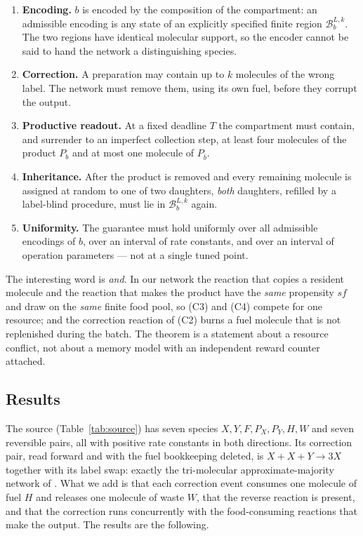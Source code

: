 \documentclass[11pt,a4paper]{article}
\theoremstyle{plain}
\theoremstyle{definition}
\theoremstyle{remark}
\newcommand{\B}{\mathcal B}
\begin{document}
\begin{enumerate}[label=(C\arabic*),leftmargin=2.6em]
\item \textbf{Encoding.} $b$ is encoded by the composition of the compartment: an
  admissible encoding is any state of an explicitly specified finite region
  $\B_b^{L,k}$. The two regions have identical molecular support, so the encoder cannot
  be said to hand the network a distinguishing species.
\item \textbf{Correction.} A preparation may contain up to $k$ molecules of the wrong
  label. The network must remove them, using its own fuel, before they corrupt the
  output.
\item \textbf{Productive readout.} At a fixed deadline $T$ the compartment must contain,
  and surrender to an imperfect collection step, at least four molecules of the product
  $P_b$ and at most one molecule of $P_{\bar b}$.
\item \textbf{Inheritance.} After the product is removed and every remaining molecule is
  assigned at random to one of two daughters, \emph{both} daughters, refilled by a
  label-blind procedure, must lie in $\B_b^{L,k}$ again.
\item \textbf{Uniformity.} The guarantee must hold uniformly over all admissible
  encodings of $b$, over an interval of rate constants, and over an interval of
  operation parameters --- not at a single tuned point.
\end{enumerate}

The interesting word is \emph{and}. In our network the reaction that copies a resident
molecule and the reaction that makes the product have the \emph{same} propensity $sf$ and
draw on the \emph{same} finite food pool, so (C3) and (C4) compete for one resource; and
the correction reaction of (C2) burns a fuel molecule that is not replenished during the
batch. The theorem is a statement about a resource conflict, not about a memory model
with an independent reward counter attached.

\subsection{Results}

The source (Table~\ref{tab:source}) has seven species $X,Y,F,P_X,P_Y,H,W$ and seven
reversible pairs, all with positive rate constants in both directions. Its correction
pair, read forward and with the fuel bookkeeping deleted, is $X+X+Y\to 3X$ together with
its label swap: exactly the tri-molecular approximate-majority network of
\citet{condon2020}. What we add is that each correction event consumes one molecule of
fuel $H$ and releases one molecule of waste $W$, that the reverse reaction is present,
and that the correction runs concurrently with the food-consuming reactions that make
the output. The results are the following.
\end{document}
